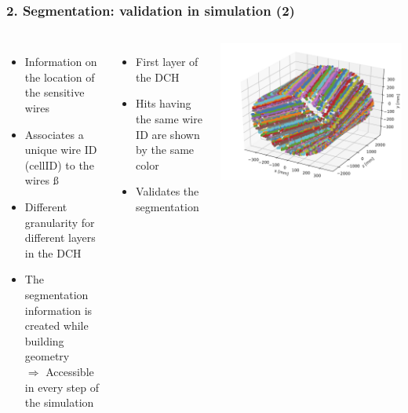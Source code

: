 \documentclass[hyperref={colorlinks=true,pdfpagelabels=false,linkcolor=black}, xcolor=dvipsnames,10pt]{beamer}
\begin{document}
\begin{frame}
	\frametitle{2. Segmentation: validation in simulation (2)}
		
	\begin{columns}[t]
		\begin{itemize}
		\item Information on the location of the sensitive wires \vspace{0.2cm}
		\item Associates a unique wire ID (cellID) to the wires \vspace{0.2cm}ß
		\item Different granularity for different layers in the DCH \vspace{0.2cm}
		\item The segmentation information is created while building geometry \vspace{0.2cm} \\
			$\Rightarrow$ Accessible in every step of the simulation
		\end{itemize}
	
		\begin{itemize}
		\item First layer of the DCH
		\item Hits having the same wire ID are shown by the same color
		\item Validates the segmentation
		\end{itemize}
		\centering
		\includegraphics[width=\textwidth]{../figures/allHits}
	\end{columns}
	
\end{frame}
\end{document}
